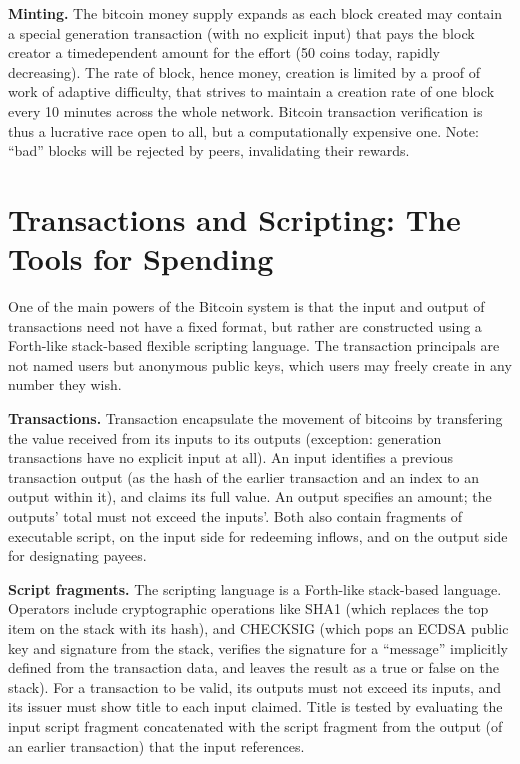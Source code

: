 \textbf{Minting.} The bitcoin money supply expands as each block created may contain a special
generation transaction (with no explicit input) that pays the block creator a timedependent
amount for the effort (50 coins today, rapidly decreasing). The rate of block,
hence money, creation is limited by a proof of work of adaptive difficulty, that strives to
maintain a creation rate of one block every 10 minutes across the whole network. Bitcoin
transaction verification is thus a lucrative race open to all, but a computationally
expensive one. Note: “bad” blocks will be rejected by peers, invalidating their rewards.

\section{Transactions and Scripting: The Tools for Spending}
One of the main powers of the Bitcoin system is that the input and output of transactions
need not have a fixed format, but rather are constructed using a Forth-like stack-based
flexible scripting language. The transaction principals are not named users
but anonymous public keys, which users may freely create in any number they wish.

\textbf{Transactions.} Transaction encapsulate the movement of bitcoins by transfering the
value received from its inputs to its outputs (exception: generation transactions have
no explicit input at all). An input identifies a previous transaction output (as the hash
of the earlier transaction and an index to an output within it), and claims its full value.
An output specifies an amount; the outputs’ total must not exceed the inputs’. Both also
contain fragments of executable script, on the input side for redeeming inflows, and on
the output side for designating payees.

\textbf{Script fragments.} The scripting language is a Forth-like stack-based language. Operators
include cryptographic operations like SHA1 (which replaces the top item on the
stack with its hash), and CHECKSIG (which pops an ECDSA public key and signature
from the stack, verifies the signature for a “message” implicitly defined from the transaction
data, and leaves the result as a true or false on the stack). For a transaction to be
valid, its outputs must not exceed its inputs, and its issuer must show title to each input
claimed. Title is tested by evaluating the input script fragment concatenated with the
script fragment from the output (of an earlier transaction) that the input references.

